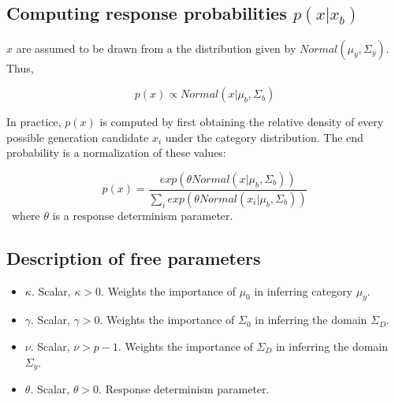 \documentclass[12pt]{article}
\begin{document}
\subsection*{Computing response probabilities $p(x | x_b)$}

$x$ are assumed to be drawn from a the distribution given by $Normal(\mu_{y}, \Sigma_{y})$. Thus, 


\begin{equation}
  p(x) \propto Normal(x | \mu_{b}, \Sigma_{b})
\end{equation}

In practice, $p(x)$ is computed by first obtaining the relative density of every possible generation candidate $x_i$ under the category distribution. The end probability is a normalization of these values:

\begin{equation}
  p(x) = \dfrac
    {exp( \theta Normal(x | \mu_{b}, \Sigma_{b}))}
    {\sum_i exp( \theta Normal(x_i |\mu_{b}, \Sigma_{b}))} 
\end{equation}
\
where $\theta$ is a response determinism parameter.

\subsection*{Description of free parameters}

\begin{itemize}
    \setlength\itemsep{-0.5em}
    \item $\kappa$. Scalar, $\kappa>0$. Weights the importance of $\mu_{0}$ in inferring category $\mu_{y}$.
    \item $\gamma$. Scalar, $\gamma>0$. Weights the importance of $\Sigma_{0}$ in inferring the domain $\Sigma_{D}$.
    \item $\nu$. Scalar, $\nu > p-1$. Weights the importance of $\Sigma_{D}$ in inferring the domain $\Sigma_{y}$.
    \item $\theta$. Scalar, $\theta > 0$. Response determinism parameter.
\end{itemize}
\end{document}
